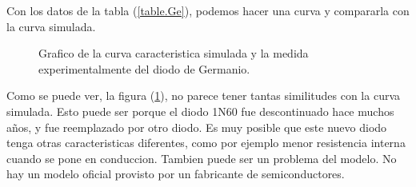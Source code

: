 \documentclass[chaptersright]{informeutn}
\begin{document}
      Con los datos de la tabla (\ref{table.Ge}), podemos hacer una curva y compararla con la curva simulada.
      \begin{figure}[!ht]
        \centering
        \caption{Grafico de la curva caracteristica simulada y la medida experimentalmente del diodo de Germanio.}
        \label{graph.comparativa.Ge}
      \end{figure}

      Como se puede ver, la figura (\ref{graph.comparativa.Ge}), no parece tener tantas similitudes con la curva
      simulada. Esto puede ser porque el diodo 1N60 fue descontinuado hace muchos años, y fue reemplazado por otro
      diodo. Es muy posible que este nuevo diodo tenga otras caracteristicas diferentes, como por ejemplo menor
      resistencia interna cuando se pone en conduccion. Tambien puede ser un problema del modelo. No hay un modelo
      oficial provisto por un fabricante de semiconductores.
\end{document}
